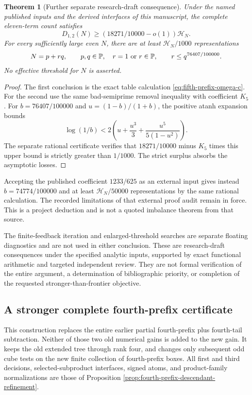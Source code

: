 \documentclass[11pt]{article}
\newtheorem{theorem}{Theorem}
\newcommand{\PP}{\mathbb P}
\newcommand{\HN}{\mathcal H_N}
\begin{document}
\begin{theorem}[Further separate research-draft consequence]
\label{thm:fifth-prefix-omega-chen}
Under the named published inputs and the derived interfaces of
this manuscript, the complete eleven-term count satisfies
\[
 D_{1,2}(N)\ge(18271/10000-o(1))\HN.
\]
For every sufficiently large even $N$, there are at least
$\HN/1000$ representations
\[
 N=p+rq,\qquad p,q\in\PP,\quad r=1\ \hbox{or}\ r\in\PP,
 \qquad r\le q^{76407/100000}.
\]
No effective threshold for $N$ is asserted.
\end{theorem}

\begin{proof}
The first conclusion is the exact table calculation
\eqref{eq:fifth-prefix-omega-c}. For the second use the same
bad-semiprime removal inequality with coefficient $K_5$.
For $b=76407/100000$ and $u=(1-b)/(1+b)$, the positive
atanh expansion bounds
\[
 \log(1/b)<2\left(u+\frac{u^3}{3}+\frac{u^5}{5(1-u^2)}\right).
\]
The separate rational certificate verifies that $18271/10000$
minus $K_5$ times this upper bound is strictly greater than
$1/1000$. The strict surplus absorbs the asymptotic losses.
\end{proof}

Accepting the published coefficient $1233/625$ as an external
input gives instead $b=74774/100000$ and at least $\HN/50000$
representations by the same rational calculation. The recorded
limitations of that external proof audit remain in force.
This is a project deduction and is not a quoted imbalance theorem
from that source.

The finite-feedback iteration and enlarged-threshold searches
are separate floating diagnostics and are not used in either
conclusion. These are research-draft consequences under the
specified analytic inputs, supported by exact functional arithmetic
and targeted independent review. They are not formal verification
of the entire argument, a determination of bibliographic priority,
or completion of the requested stronger-than-frontier objective.

\subsection{A stronger complete fourth-prefix certificate}
\label{sec:fourth-prefix-stronger-refinement}

This construction replaces the entire earlier partial fourth-prefix
plus fourth-tail subtraction.  Neither of those two old numerical
gains is added to the new gain.  It keeps the old extended tree through
rank four, and changes only subsequent odd cube tests on the new finite
collection of fourth-prefix boxes.  All first and third decisions,
selected-subproduct interfaces, signed atoms, and product-family
normalizations are those of Proposition
\ref{prop:fourth-prefix-descendant-refinement}.
\end{document}
